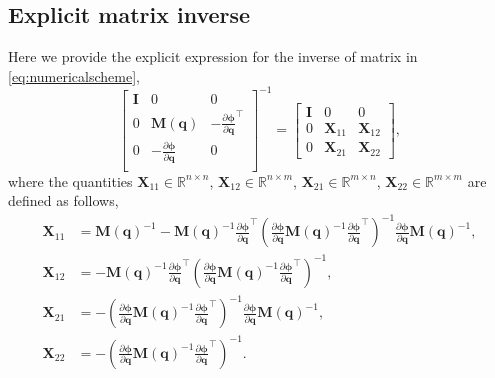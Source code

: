 %
%
	
\chapter{}
\label{sec:appendix}

\section{Explicit matrix inverse}
\label{subsec:matrixinverse}

Here we provide the explicit expression for the inverse of matrix in \cref{eq:numericalscheme},
\begin{equation*}
  \begin{bmatrix}
	\bm{I} 	&	0		&	0 \\
	0	& 	\bm{M}(\bm{q}) 	&	-\frac{\partial\bm{\phi}}{\partial\bm{q}}^{\intercal} \\
	0 	& -\frac{\partial\bm{\phi}}{\partial\bm{q}} & 0\\
  \end{bmatrix}^{-1}
  = 
  \begin{bmatrix}
	\bm{I} 	&	0		&	0 			\\
	0	& 	\bm{X}_{11} &	\bm{X}_{12} \\
	0 	& 	\bm{X}_{21} & 	\bm{X}_{22}
  \end{bmatrix},
\end{equation*}
where the quantities $\bm{X}_{11}\in\mathbb{R}^{n\times n}$,
$\bm{X}_{12}\in\mathbb{R}^{n\times m}$, $\bm{X}_{21}\in\mathbb{R}^{m\times n}$,
$\bm{X}_{22}\in\mathbb{R}^{m\times m}$ are defined as follows,
\begin{subequations}
  \begin{align*}
    \bm{X}_{11} &= 
    \bm{M}(\bm{q})^{-1}- \bm{M}(\bm{q})^{-1}
    \frac{\partial\bm{\phi}}{\partial\bm{q}}^{\intercal}
    \left(\frac{\partial\bm{\phi}}{\partial\bm{q}}
    \bm{M}(\bm{q})^{-1}\frac{\partial\bm{\phi}}{\partial\bm{q}}^{\intercal}\right)^{-1}
    \frac{\partial\bm{\phi}}{\partial\bm{q}}\bm{M}(\bm{q})^{-1}, 
    \\
	\bm{X}_{12} &=
	-\bm{M}(\bm{q})^{-1}\frac{\partial\bm{\phi}}{\partial\bm{q}}^{\intercal}
	\left(\frac{\partial\bm{\phi}}{\partial\bm{q}}\bm{M}(\bm{q})^{-1}
	\frac{\partial\bm{\phi}}{\partial\bm{q}}^{\intercal}\right)^{-1},
	\\
    \bm{X}_{21} &=
    - \left(\frac{\partial\bm{\phi}}{\partial\bm{q}}
    \bm{M}(\bm{q})^{-1}\frac{\partial\bm{\phi}}{\partial\bm{q}}^{\intercal}\right)^{-1}
    \frac{\partial\bm{\phi}}{\partial\bm{q}}\bm{M}(\bm{q})^{-1},
    \\
    \bm{X}_{22} &=
    -\left(\frac{\partial\bm{\phi}}{\partial\bm{q}}
    \bm{M}(\bm{q})^{-1}\frac{\partial\bm{\phi}}{\partial\bm{q}}^{\intercal}\right)^{-1}.
  \end{align*}
\end{subequations}
